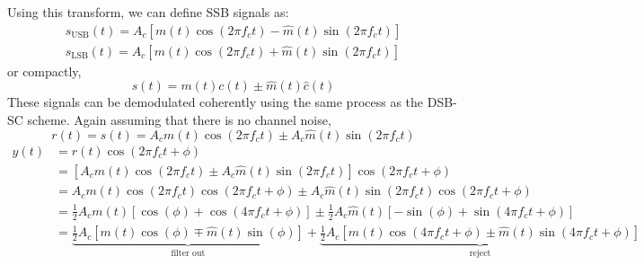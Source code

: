 \documentclass{article}
\begin{document}
Using this transform, we can define SSB signals as:
\begin{gather*}
    s_{\mathrm{USB}}\left( t \right) = A_c \left[ m\left( t \right) \cos{\left( 2 \pi f_c t \right)} - \hat{m}\left( t \right) \sin{\left( 2 \pi f_c t \right)} \right] \\
    s_{\mathrm{LSB}}\left( t \right) = A_c \left[ m\left( t \right) \cos{\left( 2 \pi f_c t \right)} + \hat{m}\left( t \right) \sin{\left( 2 \pi f_c t \right)} \right]
\end{gather*}
or compactly,
\begin{equation*}
    s\left( t \right) = m\left( t \right) c\left( t \right) \pm \hat{m}\left( t \right) \hat{c}\left( t \right)
\end{equation*}
These signals can be demodulated coherently using the same process as
the DSB-SC scheme. Again assuming that there is no channel noise,
\begin{equation*}
    r\left( t \right) = s\left( t \right) = A_c m\left( t \right) \cos{\left( 2\pi f_c t \right)} \pm A_c \hat{m}\left( t \right) \sin{\left( 2\pi f_c t \right)}
\end{equation*}
\begin{align*}
    y\left( t \right) & = r\left( t \right) \cos{\left( 2 \pi f_c t + \phi \right)}                                                                                                                                                                                                                                                                                                     \\
                      & = \left[ A_c m\left( t \right) \cos{\left( 2\pi f_c t \right)} \pm A_c \hat{m}\left( t \right) \sin{\left( 2\pi f_c t \right)} \right] \cos{\left( 2 \pi f_c t + \phi \right)}                                                                                                                                                                                  \\
                      & = A_c m\left( t \right) \cos{\left( 2\pi f_c t \right)} \cos{\left( 2 \pi f_c t + \phi \right)} \pm A_c \hat{m}\left( t \right) \sin{\left( 2\pi f_c t \right)} \cos{\left( 2 \pi f_c t + \phi \right)}                                                                                                                                                         \\
                      & = \frac{1}{2} A_c m\left( t \right) \left[ \cos{\left( \phi \right)} + \cos{\left( 4 \pi f_c t + \phi \right)} \right] \pm \frac{1}{2} A_c \hat{m}\left( t \right) \left[ -\sin{\left( \phi \right)} + \sin{\left( 4 \pi f_c t + \phi \right)} \right]                                                                                                          \\
                      & = \underbrace{\frac{1}{2} A_c \left[ m\left( t \right) \cos{\left( \phi \right)} \mp \hat{m}\left( t \right) \sin{\left( \phi \right)} \right]}_{\text{filter out}} + \underbrace{\frac{1}{2} A_c \left[ m\left( t \right) \cos{\left( 4 \pi f_c t + \phi \right)} \pm \hat{m}\left( t \right) \sin{\left( 4 \pi f_c t + \phi \right)} \right]}_{\text{reject}}
\end{align*}
\end{document}
